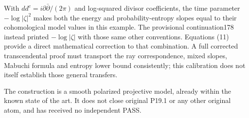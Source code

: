 \documentclass[11pt]{article}
\newcommand{\ddc}{dd^c}
\begin{document}
With $\ddc=i\partial\bar\partial/(2\pi)$ and log-squared divisor
coefficients, the time parameter $-\log|\zeta|^2$ makes both
the energy and probability-entropy slopes equal to their
cohomological model values in this example.
The provisional continuation178 instead printed
$-\log|\zeta|$ with those same other conventions.
Equations (11) provide a direct mathematical correction to that
combination. A full corrected transcendental proof must transport
the ray correspondence, mixed slopes, Mabuchi formula and entropy
lower bound consistently; this calibration does not itself
establish those general transfers.

The construction is a smooth polarized projective model, already
within the known state of the art. It does not close original P19.1
or any other original atom, and has received no independent PASS.
\end{document}
